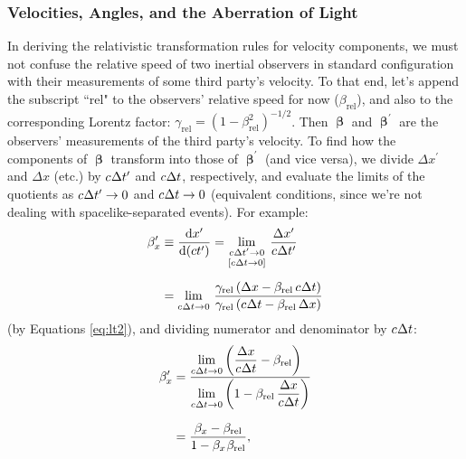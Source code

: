 \documentclass[12pt]{article}
\newcommand{\dd}[1]{\mathrm{d}#1}
\newcommand{\vvbeta}{\bm{\upbeta}}
\begin{document}
\subsubsection{Velocities, Angles, and the Aberration of Light}\label{sssec:va}
In deriving the relativistic transformation rules for velocity components, we must not confuse the relative speed of two inertial observers in standard configuration with their measurements of some third party's velocity. To that end, let's append the subscript ``rel" to the observers' relative speed for now ($\beta_{\textrm{rel}}$), and also to the corresponding Lorentz factor: $\gamma_{\textrm{rel}} = (1 - \beta_{\textrm{rel}}^2)^{-1/2}$. Then $\vvbeta$ and $\vvbeta^{\prime}$ are the observers' measurements of the third party's velocity. To find how the components of $\vvbeta$ transform into those of $\vvbeta^{\prime}$ (and vice versa), we divide $\Delta x^\prime$ and $\Delta x$ (etc.) by $c \mkern.5mu \Delta t^\prime$ and $c \mkern.5mu \Delta t$, respectively, and evaluate the limits of the quotients as $c \mkern.5mu \Delta t^\prime \rightarrow 0$ and $c \mkern.5mu \Delta t \rightarrow 0$ (equivalent conditions, since we're not dealing with spacelike-separated events). For example:
\begin{equation*}
\begin{aligned}
\beta_x^\prime &\equiv \dfrac{\dd x^\prime}{\dd (ct^\prime)} = \lim_{\substack{c \mkern.5mu \Delta t^\prime \to 0 \\[1.5pt] [c \mkern.5mu \Delta t \to 0]}} \, \frac{\Delta x^\prime}{c \mkern.5mu \Delta t^\prime}\\[6pt]
&= \lim_{\substack{\\ c \mkern.5mu \Delta t \to 0}} \, \frac{\gamma_{\textrm{rel}} \left( \Delta x - \beta_{\textrm{rel}} \, c \mkern.5mu \Delta t \right)}{\gamma_{\textrm{rel}} \left( c \mkern.5mu \Delta t - \beta_{\textrm{rel}} \, \Delta x \right)}
\end{aligned}
\end{equation*}
(by Equations \ref{eq:lt2}), and dividing numerator and denominator by $c \mkern.5mu \Delta t$:
\begin{equation*}
\begin{aligned}
\beta_x^\prime &= \frac{\lim\limits_{\substack{\\ c \mkern.5mu \Delta t \to 0}} \left( \dfrac{\Delta x}{c \mkern.5mu \Delta t} - \beta_{\textrm{rel}} \right) \hfill}{\lim\limits_{\substack{\\ c \mkern.5mu \Delta t \to 0}} \left( 1 - \beta_{\textrm{rel}} \, \dfrac{\Delta x}{c \mkern.5mu \Delta t} \right) }\\[7pt]
&= \frac{\beta_x - \beta_{\textrm{rel}}}{1 - \beta_{x} \mkern1mu \beta_{\textrm{rel}}},
\end{aligned}
\end{equation*}
\end{document}
